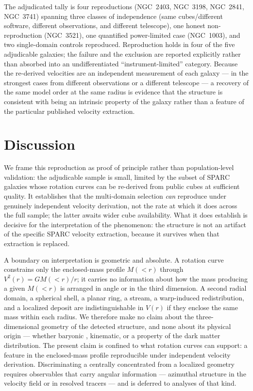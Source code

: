\documentclass[linenumbers,twocolumn]{aastex701}
\begin{document}
The adjudicated tally is four reproductions (NGC~2403, NGC~3198, NGC~2841,
NGC~3741) spanning three classes of independence (same cubes/different software,
different observations, and different telescope), one honest non-reproduction
(NGC~3521), one quantified power-limited case (NGC~1003), and two single-domain
controls reproduced. Reproduction holds in four of the five adjudicable galaxies;
the failure and the exclusion are reported explicitly rather than absorbed into an
undifferentiated ``instrument-limited'' category. Because the re-derived
velocities are an independent measurement of each galaxy --- in the strongest
cases from different observations or a different telescope --- a recovery of the
same model order at the same radius is evidence that the structure is consistent with being an intrinsic property of the
galaxy rather than a feature of the particular published velocity extraction.

\section{Discussion} \label{sec:discussion}

We frame this reproduction as proof of principle rather than population-level
validation: the adjudicable sample is small, limited by the subset of SPARC
galaxies whose rotation curves can be re-derived from public cubes at sufficient
quality. It establishes that the multi-domain selection \emph{can} reproduce under
genuinely independent velocity derivation, not the rate at which it does across
the full sample; the latter awaits wider cube availability. What it does establish
is decisive for the interpretation of the phenomenon: the structure is not an
artifact of the specific SPARC velocity extraction, because it survives when that
extraction is replaced.

A boundary on interpretation is geometric and absolute. A rotation curve
constrains only the enclosed-mass profile $M({<}r)$ through $V^2(r) = G
M({<}r)/r$; it carries no information about how the mass producing a given
$M({<}r)$ is arranged in angle or in the third dimension. A second radial domain,
a spherical shell, a planar ring, a stream, a warp-induced redistribution, and a
localized deposit are indistinguishable in $V(r)$ if they enclose the same mass
within each radius. We therefore make no claim about the three-dimensional
geometry of the detected structure, and none about its physical origin --- whether
baryonic \citep[e.g.\ features propagated from the gas disk;][]{Sancisi2004},
kinematic, or a property of the dark matter distribution. The present claim is
confined to what rotation curves can support: a feature in the enclosed-mass profile
reproducible under independent velocity derivation. Discriminating a centrally concentrated from
a localized geometry requires observables that carry angular information ---
azimuthal structure in the velocity field or in resolved tracers --- and is
deferred to analyses of that kind.
\end{document}
